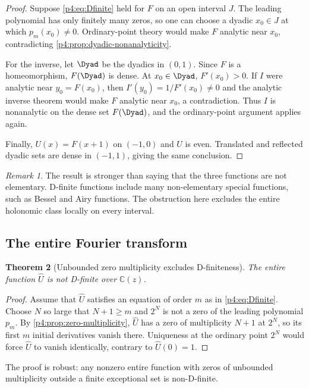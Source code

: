 \documentclass[11pt]{article}
\numberwithin{equation}{section}
\newtheorem{theorem}{Theorem}[section]
\theoremstyle{definition}
\theoremstyle{remark}
\newtheorem{remark}[theorem]{Remark}
\newcommand{\C}{\mathbb C}
\begin{document}
\begin{proof}
Suppose \eqref{p4:eq:Dfinite} held for $F$ on an open interval $J$.  The leading polynomial has only finitely many zeros, so one can choose a dyadic $x_0\in J$ at which $p_m(x_0)\ne0$.  Ordinary-point theory would make $F$ analytic near $x_0$, contradicting \cref{p4:prop:dyadic-nonanalyticity}.

For the inverse, let $\Dyad$ be the dyadics in $(0,1)$.  Since $F$ is a homeomorphism, $F(\Dyad)$ is dense.  At $x_0\in\Dyad$, $F'(x_0)>0$.  If $I$ were analytic near $y_0=F(x_0)$, then $I'(y_0)=1/F'(x_0)\ne0$ and the analytic inverse theorem would make $F$ analytic near $x_0$, a contradiction.  Thus $I$ is nonanalytic on the dense set $F(\Dyad)$, and the ordinary-point argument applies again.

Finally, $U(x)=F(x+1)$ on $(-1,0)$ and $U$ is even.  Translated and reflected dyadic sets are dense in $(-1,1)$, giving the same conclusion.
\end{proof}

\begin{remark}
The result is stronger than saying that the three functions are not elementary.  D-finite functions include many non-elementary special functions, such as Bessel and Airy functions.  The obstruction here excludes the entire holonomic class locally on every interval.
\end{remark}

\subsection{The entire Fourier transform}
\begin{theorem}[Unbounded zero multiplicity excludes D-finiteness]
\label{p4:thm:fourier-nondfinite}
The entire function $\widehat U$ is not D-finite over $\C(z)$.
\end{theorem}

\begin{proof}
Assume that $\widehat U$ satisfies an equation of order $m$ as in \eqref{p4:eq:Dfinite}.  Choose $N$ so large that $N+1\ge m$ and $2^N$ is not a zero of the leading polynomial $p_m$.  By \cref{p4:prop:zero-multiplicity}, $\widehat U$ has a zero of multiplicity $N+1$ at $2^N$, so its first $m$ initial derivatives vanish there.  Uniqueness at the ordinary point $2^N$ would force $\widehat U$ to vanish identically, contrary to $\widehat U(0)=1$.
\end{proof}

The proof is robust: any nonzero entire function with zeros of unbounded multiplicity outside a finite exceptional set is non-D-finite.
\end{document}
